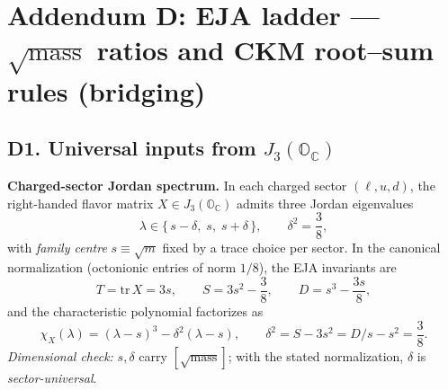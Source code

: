 \documentclass[11pt]{article}
\begin{document}
  \titlepageOpen

  \begin{abstract}


  \end{abstract}

  \titlepageClose
  \fi

  \ifdefined\standalonechapter
  \section{\papertitle}
  \else
  \fi



  \section*{Addendum D: EJA ladder — $\sqrt{\text{mass}}$ ratios and CKM root–sum rules (bridging)}

      \subsection*{D1. Universal inputs from $J_{3}(\mathbb{O}_{\mathbb{C}})$}

          \textbf{Charged-sector Jordan spectrum.}
          In each charged sector $(\ell,u,d)$, the right-handed flavor matrix $X\in J_3(\mathbb{O}_{\mathbb{C}})$ admits three Jordan eigenvalues
          \begin{equation}\tag{D1}
          \lambda \in \{\,s-\delta,\; s,\; s+\delta\,\},\qquad \delta^{2}=\frac{3}{8},
          \end{equation}
          with \emph{family centre} $s\equiv \sqrt{m}$ fixed by a trace choice per sector. In the canonical normalization (octonionic entries of norm $1/8$), the EJA invariants are
          \begin{equation}\tag{D2}
          T=\mathrm{tr}\,X=3s,\qquad S=3s^{2}-\frac{3}{8},\qquad D=s^{3}-\frac{3s}{8},
          \end{equation}
          and the characteristic polynomial factorizes as
          \begin{equation}\tag{D3}
          \chi_X(\lambda)=(\lambda-s)^{3}-\delta^{2}(\lambda-s),\qquad
          \delta^{2}=S-3s^{2}=D/s-s^{2}=\frac{3}{8}.
          \end{equation}
          \textit{Dimensional check:} $s,\delta$ carry $[\sqrt{\text{mass}}]$; with the stated normalization, $\delta$ is \emph{sector-universal}.
\end{document}
